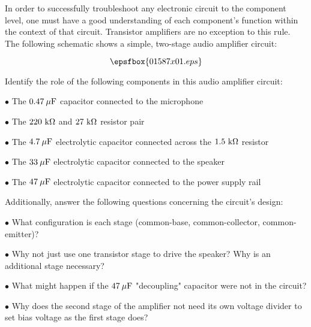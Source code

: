 

In order to successfully troubleshoot any electronic circuit to the component level, one must have a good understanding of each component's function within the context of that circuit.  Transistor amplifiers are no exception to this rule.  The following schematic shows a simple, two-stage audio amplifier circuit:

$$\epsfbox{01587x01.eps}$$

Identify the role of the following components in this audio amplifier circuit:

\medskip
\item{$\bullet$} The $0.47 \> \mu \hbox{F}$ capacitor connected to the microphone
\item{$\bullet$} The $220 \hbox{ k} \Omega$ and $27 \hbox{ k} \Omega$ resistor pair
\item{$\bullet$} The $4.7 \> \mu \hbox{F}$ electrolytic capacitor connected across the $1.5 \hbox{ k} \Omega$ resistor
\item{$\bullet$} The $33 \> \mu \hbox{F}$ electrolytic capacitor connected to the speaker
\item{$\bullet$} The $47 \> \mu \hbox{F}$ electrolytic capacitor connected to the power supply rail
\medskip

Additionally, answer the following questions concerning the circuit's design:

\medskip
\item{$\bullet$} What configuration is each stage (common-base, common-collector, common-emitter)?
\item{$\bullet$} Why not just use one transistor stage to drive the speaker?  Why is an additional stage necessary?
\item{$\bullet$} What might happen if the $47 \> \mu \hbox{F}$ "decoupling" capacitor were not in the circuit? 
\item{$\bullet$} Why does the second stage of the amplifier not need its own voltage divider to set bias voltage as the first stage does?
\medskip







